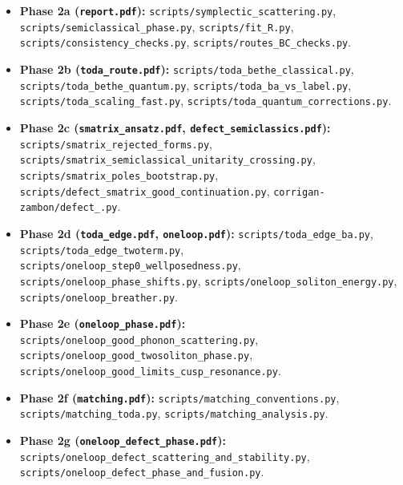 \documentclass[11pt,a4paper]{article}
\newcommand{\script}[1]{\texttt{scripts/#1}}
\theoremstyle{remark}\newtheorem{remark}[proposition]{Remark}
\begin{document}
\begin{itemize}
\item \textbf{Phase 2a (\texttt{report.pdf}):} \script{symplectic\_\allowbreak scattering.py}, \script{semiclassical\_\allowbreak phase.py}, \script{fit\_\allowbreak R.py}, \script{consistency\_\allowbreak checks.py}, \script{routes\_\allowbreak BC\_\allowbreak checks.py}.
\item \textbf{Phase 2b (\texttt{toda\_\allowbreak route.pdf}):} \script{toda\_\allowbreak bethe\_\allowbreak classical.py}, \script{toda\_\allowbreak bethe\_\allowbreak quantum.py}, \script{toda\_\allowbreak ba\_\allowbreak vs\_\allowbreak label.py}, \script{toda\_\allowbreak scaling\_\allowbreak fast.py}, \script{toda\_\allowbreak quantum\_\allowbreak corrections.py}.
\item \textbf{Phase 2c (\texttt{smatrix\_\allowbreak ansatz.pdf}, \texttt{defect\_\allowbreak semiclassics.pdf}):} \script{smatrix\_\allowbreak rejected\_\allowbreak forms.py}, \script{smatrix\_\allowbreak semiclassical\_\allowbreak unitarity\_\allowbreak crossing.py}, \script{smatrix\_\allowbreak poles\_\allowbreak bootstrap.py}, \script{defect\_\allowbreak smatrix\_\allowbreak good\_\allowbreak continuation.py}, \texttt{corrigan-zambon/defect\_\allowbreak *.py}.
\item \textbf{Phase 2d (\texttt{toda\_\allowbreak edge.pdf}, \texttt{oneloop.pdf}):} \script{toda\_\allowbreak edge\_\allowbreak ba.py}, \script{toda\_\allowbreak edge\_\allowbreak twoterm.py}, \script{oneloop\_\allowbreak step0\_\allowbreak wellposedness.py}, \script{oneloop\_\allowbreak phase\_\allowbreak shifts.py}, \script{oneloop\_\allowbreak soliton\_\allowbreak energy.py}, \script{oneloop\_\allowbreak breather.py}.
\item \textbf{Phase 2e (\texttt{oneloop\_\allowbreak phase.pdf}):} \script{oneloop\_\allowbreak good\_\allowbreak phonon\_\allowbreak scattering.py}, \script{oneloop\_\allowbreak good\_\allowbreak twosoliton\_\allowbreak phase.py}, \script{oneloop\_\allowbreak good\_\allowbreak limits\_\allowbreak cusp\_\allowbreak resonance.py}.
\item \textbf{Phase 2f (\texttt{matching.pdf}):} \script{matching\_\allowbreak conventions.py}, \script{matching\_\allowbreak toda.py}, \script{matching\_\allowbreak analysis.py}.
\item \textbf{Phase 2g (\texttt{oneloop\_\allowbreak defect\_\allowbreak phase.pdf}):} \script{oneloop\_\allowbreak defect\_\allowbreak scattering\_\allowbreak and\_\allowbreak stability.py}, \script{oneloop\_\allowbreak defect\_\allowbreak phase\_\allowbreak and\_\allowbreak fusion.py}.

\end{itemize}
\end{document}
